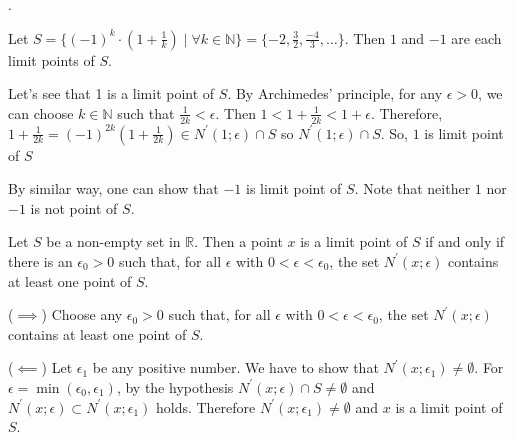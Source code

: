\documentclass[8pt]{beamer}
\newcommand{\mbb}[1]{\mathbb{#1}}
\begin{document}
\begin{frame}{.}
    \begin{example}
        Let $S = \{(-1)^k \cdot (1+\frac{1}{k}) \mid \forall k \in \mbb{N}\} = \{-2, \frac{3}{2}, \frac{-4}{3}, \dots\}$.
        Then $1$ and $-1$ are each limit points of $S$.

        Let's see that 1 is a limit point of $S$.
        By Archimedes' principle, for any $\epsilon>0$, we can choose $k \in \mbb{N}$ such that $\frac{1}{2k} < \epsilon$.
        Then $1<1 + \frac{1}{2k} < 1 + \epsilon$.
        Therefore, $1 + \frac{1}{2k} = (-1)^{2k} (1 + \frac{1}{2k}) \in N^\prime(1; \epsilon) \cap S$ so $N^\prime(1;\epsilon) \cap S$.
        So, $1$ is limit point of $S$

        By similar way, one can show that $-1$ is limit point of $S$.
        Note that neither $1$ nor $-1$ is not point of $S$.
    \end{example}

    \begin{theorem} \label{th:2}
        Let $S$ be a non-empty set in $\mbb{R}$.
        Then a point $x$ is a limit point of $S$ if and only if there is an $\epsilon_0 > 0$ such that, for all $\epsilon$ with $0 < \epsilon < \epsilon_0$, the set $N^\prime(x;\epsilon)$ contains at least one point of $S$.

        ($\implies$) Choose any $\epsilon_0 > 0$ such that, for all $\epsilon$ with $0 < \epsilon < \epsilon_0$, the set $N^\prime (x; \epsilon)$ contains at least one point of $S$.

        ($\impliedby$) Let $\epsilon_1$ be any positive number.
        We have to show that $N^\prime(x; \epsilon_1) \neq \emptyset$.
        For $\epsilon = \min(\epsilon_0, \epsilon_1)$, by the hypothesis $N^\prime(x; \epsilon) \cap S \neq \emptyset$ and $N^\prime(x; \epsilon) \subset N^\prime(x; \epsilon_1)$ holds.
        Therefore $N^\prime(x; \epsilon_1) \neq \emptyset$ and $x$ is a limit point of $S$.
    \end{theorem}
\end{frame}
\end{document}
